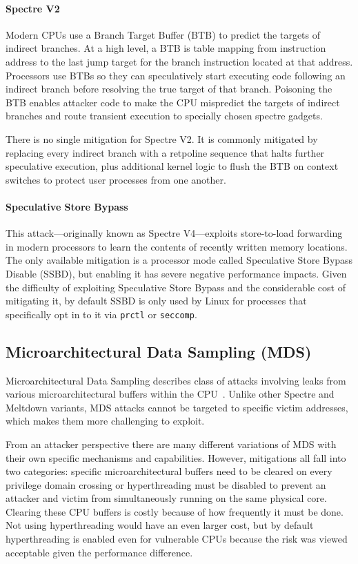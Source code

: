 \paragraph{Spectre V2~\cite{kocher:spectre}}

Modern CPUs use a Branch Target Buffer (BTB) to predict the targets of indirect branches.
At a high level, a BTB is table mapping from instruction address to the last jump target for the branch instruction located at that address.
Processors use BTBs so they can speculatively start executing code following an indirect branch before resolving the true target of that branch.
Poisoning the BTB enables attacker code to make the CPU mispredict the targets of indirect branches and route transient execution to specially chosen spectre gadgets.

There is no single mitigation for Spectre V2.
It is commonly mitigated by replacing every indirect branch with a retpoline sequence \cite{intel:retpoline} that halts further speculative execution, plus additional kernel logic to flush the BTB on context switches to protect user processes from one another.

\paragraph{Speculative Store Bypass~\cite{horn:speculative-store-bypass}}
This attack---originally known as Spectre V4---exploits store-to-load forwarding in modern processors to learn the contents of recently written memory locations.
The only available mitigation is a processor mode called Speculative Store Bypass Disable (SSBD), but enabling it has severe negative performance impacts.
Given the difficulty of exploiting Speculative Store Bypass and the considerable cost of mitigating it, by default SSBD is only used by Linux for processes that specifically opt in to it via \texttt{prctl} or \texttt{seccomp}.

\subsection{Microarchitectural Data Sampling (MDS)}
Microarchitectural Data Sampling describes class of attacks involving leaks from various microarchitectural buffers within the CPU~\cite{canella:fallout, schwarz:zombieload,schaik:ridl}.
Unlike other Spectre and Meltdown variants, MDS attacks cannot be targeted to specific victim addresses, which makes them more challenging to exploit.

From an attacker perspective there are many different variations of MDS with their own specific mechanisms and capabilities.
However, mitigations all fall into two categories: specific microarchitectural buffers need to be cleared on every privilege domain crossing or hyperthreading must be disabled to prevent an attacker and victim from simultaneously running on the same physical core.
Clearing these CPU buffers is costly because of how frequently it must be done.
Not using hyperthreading would have an even larger cost, but by default
hyperthreading is enabled even for vulnerable CPUs because the risk was viewed acceptable given the performance difference.


